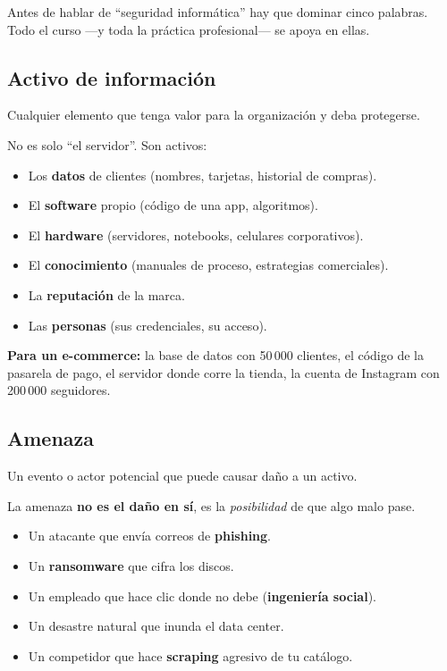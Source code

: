 \documentclass[12pt,a4paper]{article}
\begin{document}
Antes de hablar de ``seguridad inform\'atica'' hay que dominar cinco palabras.
Todo el curso ---y toda la pr\'actica profesional--- se apoya en ellas.

\subsection{Activo de informaci\'on}
\begin{cajaDefinicion}
Cualquier elemento que tenga valor para la organizaci\'on y deba protegerse.
\end{cajaDefinicion}

No es solo ``el servidor''. Son activos:
\begin{itemize}[leftmargin=2em]
  \item Los \textbf{datos} de clientes (nombres, tarjetas, historial de compras).
  \item El \textbf{software} propio (c\'odigo de una app, algoritmos).
  \item El \textbf{hardware} (servidores, notebooks, celulares corporativos).
  \item El \textbf{conocimiento} (manuales de proceso, estrategias comerciales).
  \item La \textbf{reputaci\'on} de la marca.
  \item Las \textbf{personas} (sus credenciales, su acceso).
\end{itemize}

\begin{cajaEjemplo}
\textbf{Para un e-commerce:} la base de datos con 50\,000 clientes, el c\'odigo de
la pasarela de pago, el servidor donde corre la tienda, la cuenta de Instagram
con 200\,000 seguidores.
\end{cajaEjemplo}

\subsection{Amenaza}
\begin{cajaDefinicion}
Un evento o actor potencial que puede causar da\~no a un activo.
\end{cajaDefinicion}

La amenaza \textbf{no es el da\~no en s\'i}, es la \emph{posibilidad} de que algo malo pase.
\begin{itemize}[leftmargin=2em]
  \item Un atacante que env\'ia correos de \textbf{phishing}.
  \item Un \textbf{ransomware} que cifra los discos.
  \item Un empleado que hace clic donde no debe (\textbf{ingenier\'ia social}).
  \item Un desastre natural que inunda el data center.
  \item Un competidor que hace \textbf{scraping} agresivo de tu cat\'alogo.
\end{itemize}
\end{document}
